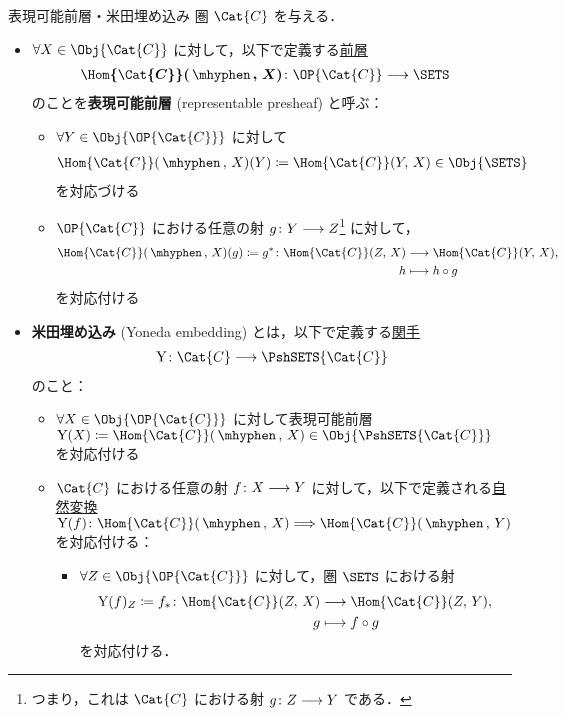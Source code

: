\documentclass[TQFT_main]{subfiles}
\begin{document}
\begin{mydef}[label=def:representable,breakable]{表現可能前層・米田埋め込み}
    圏 $\Cat{C}$ を与える．
    \begin{itemize}
        \item $\forall X \in \Obj{\Cat{C}}$ に対して，以下で定義する\hyperref[def:presheaf-general]{前層}
        \begin{align}
            \bm{\Hom{\Cat{C}}(\,\mhyphen\,,\, X)} \colon \OP{\Cat{C}} &\lto \SETS
        \end{align}
        のことを\textbf{表現可能前層} (representable presheaf) と呼ぶ：
        \begin{itemize}
            \item $\forall Y \in \Obj{\OP{\Cat{C}}}$ に対して
            \begin{align}
                \Hom{\Cat{C}}(\,\mhyphen\,,\, X) (Y) \coloneqq \Hom{\Cat{C}}(Y,\, X) \in \Obj{\SETS}
            \end{align}
            を対応づける
            \item $\OP{\Cat{C}}$ における任意の射 $g \colon Y \longrightarrow Z$\footnote{つまり，これは $\Cat{C}$ における射 $g \colon Z \longrightarrow Y$ である．} に対して，
            \begin{align}
                \Hom{\Cat{C}}(\,\mhyphen\,,\, X)(g) \coloneqq g^* \colon \Hom{\Cat{C}} (Z,\, X) &\lto \Hom{\Cat{C}} (Y,\, X),\\ 
                h &\lmto h \circ g
            \end{align}
            を対応付ける
        \end{itemize}
        \item \textbf{米田埋め込み} (Yoneda embedding) とは，以下で定義する\hyperref[def:functor]{関手}
        \begin{align}
            \mathrm{Y} \colon \Cat{C} \lto \PshSETS{\Cat{C}}
        \end{align}
        のこと：
        \begin{itemize}
            \item $\forall X \in \Obj{\OP{\Cat{C}}}$ に対して表現可能前層 $\mathrm{Y} (X) \coloneqq \Hom{\Cat{C}}(\,\mhyphen\,,\, X) \in \Obj{\PshSETS{\Cat{C}}}$ を対応付ける
            \item $\Cat{C}$ における任意の射 $f \colon X \longrightarrow Y$ に対して，以下で定義される\hyperref[def:nat]{自然変換} $\mathrm{Y}(f) \colon \Hom{\Cat{C}}(\,\mhyphen\,,\, X) \Longrightarrow \Hom{\Cat{C}}(\,\mhyphen\,,\, Y)$ を対応付ける：
            \begin{itemize}
                \item $\forall Z \in \Obj{\OP{\Cat{C}}}$ に対して，圏 $\SETS$ における射
                \begin{align}
                    \mathrm{Y}(f)_Z \coloneqq f_*\colon \Hom{\Cat{C}}(Z,\, X) &\lto \Hom{\Cat{C}}(Z,\, Y), \\
                    g &\lmto f \circ g
                \end{align}
                を対応付ける．
            \end{itemize}
            

\end{itemize}
\end{itemize}
\end{mydef}
\end{document}
